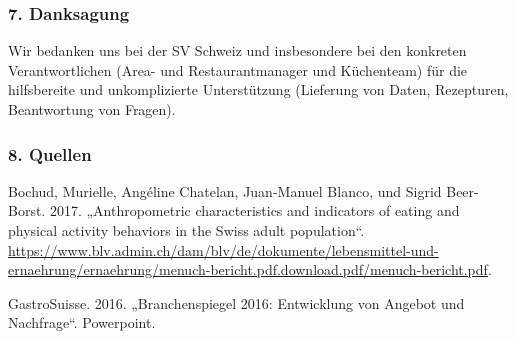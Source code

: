 \documentclass[12pt,ngerman,]{article}
\begin{document}
\hypertarget{danksagung}{%
\subsubsection{7. Danksagung}\label{danksagung}}

Wir bedanken uns bei der SV Schweiz und insbesondere bei den konkreten
Verantwortlichen (Area- und Restaurantmanager und Küchenteam) für die
hilfsbereite und unkomplizierte Unterstützung (Lieferung von Daten,
Rezepturen, Beantwortung von Fragen).

\hypertarget{quellen}{%
\subsubsection*{8. Quellen}\label{quellen}}

\hypertarget{refs}{}
\leavevmode\hypertarget{ref-bochud_anthropometric_2017}{}%
Bochud, Murielle, Angéline Chatelan, Juan-Manuel Blanco, und Sigrid
Beer-Borst. 2017. „Anthropometric characteristics and indicators of
eating and physical activity behaviors in the Swiss adult population``.
\url{https://www.blv.admin.ch/dam/blv/de/dokumente/lebensmittel-und-ernaehrung/ernaehrung/menuch-bericht.pdf.download.pdf/menuch-bericht.pdf}.

\leavevmode\hypertarget{ref-gastrosuisse_branchenspiegel_2016}{}%
GastroSuisse. 2016. „Branchenspiegel 2016: Entwicklung von Angebot und
Nachfrage``. Powerpoint.
\end{document}
